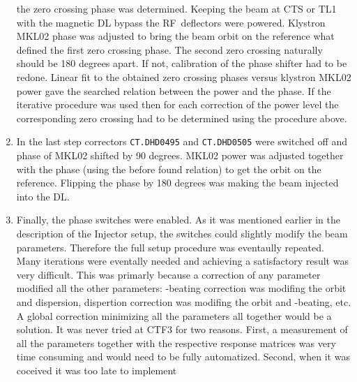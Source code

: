 \begin{enumerate}
the zero crossing phase was determined.
Keeping the beam at CTS or TL1 with the magnetic \ac{DL} bypass the RF~deflectors were powered. 
Klystron MKL02 phase was adjusted to bring the beam orbit on the reference 
what defined the first zero crossing phase. The second zero crossing naturally
should be 180 degrees apart. If not, calibration of the phase shifter had to be redone.
Linear fit to the obtained zero crossing phases versus klystron MKL02 power
gave the searched relation between the power and the phase.
If the iterative procedure was used then for each correction of the power level
the corresponding zero crossing had to be determined using the procedure above.
\item
In the last step correctors \texttt{CT.DHD0495} and \texttt{CT.DHD0505}
were switched off and phase of MKL02 shifted by 90 degrees.
MKL02 power was adjusted together with the phase (using the before found
relation) to get the orbit on the reference. Flipping the phase by 180 degrees
was making the beam injected into the \ac{DL}.
\item
Finally, the phase switches were enabled. 
As it was mentioned earlier in the description of the Injector setup, 
the switches could slightly modify the beam parameters.
Therefore the full setup procedure was eventaully repeated. 
Many iterations were eventally needed and achieving a satisfactory result 
was very difficult.
This was primarly because a correction of any parameter modified all the other parameters:
\textbeta-beating correction was modifing the orbit and dispersion,
dispertion correction was modifing the orbit and \textbeta-beating, etc. 
A global correction minimizing all the parameters all together would be a solution.
It was never tried at CTF3 for two reasons. 
First, a measurement of all the parameters together with the respective response matrices
was very time consuming and would need to be fully automatized.
Second, when it was coceived it was too late to implement 




\end{enumerate}


























